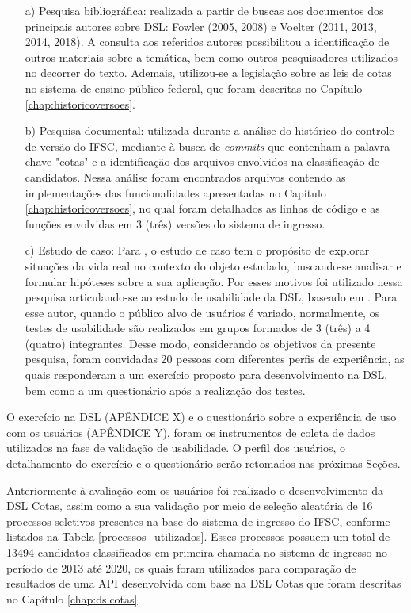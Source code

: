\begin{enumerate}
    \item[a)] Pesquisa bibliográfica: realizada a partir de buscas aos documentos dos principais autores sobre \gls{DSL}: Fowler (2005, 2008) e Voelter (2011, 2013, 2014, 2018). A consulta aos referidos autores possibilitou a identificação de outros materiais sobre a temática, bem como outros pesquisadores utilizados no decorrer do texto. Ademais, utilizou-se a legislação sobre as leis de cotas no sistema de ensino público federal, que foram descritas no Capítulo \ref{chap:historicoversoes}. 

    
    \item[b)] Pesquisa documental: utilizada durante a análise do histórico do controle de versão do \gls{IFSC}, mediante à busca de \textit{commits} que contenham a palavra-chave "cotas" e a identificação dos arquivos envolvidos na classificação de candidatos. Nessa análise foram encontrados arquivos contendo as implementações das funcionalidades apresentadas no Capítulo \ref{chap:historicoversoes}, no qual foram detalhados as linhas de código e as funções envolvidas em 3 (três) versões do sistema de ingresso. 
    
    \item[c)] Estudo de caso: Para , o estudo de caso tem o propósito de explorar situações da vida real no contexto do objeto estudado, buscando-se analisar e formular hipóteses sobre a sua aplicação. Por esses motivos foi utilizado nessa pesquisa articulando-se ao estudo de usabilidade da \gls{DSL}, baseado em . Para esse autor, quando o público alvo de usuários é variado, normalmente, os testes de usabilidade são realizados em grupos formados de 3 (três) a 4 (quatro) integrantes. Desse modo, considerando os objetivos da presente pesquisa, foram convidadas 20 pessoas com diferentes perfis de experiência, as quais responderam a um exercício proposto para desenvolvimento na \gls{DSL}, bem como a um questionário após a realização dos testes. 
    
\end{enumerate}

    O exercício na DSL (APÊNDICE X) e o questionário sobre a experiência de uso com os usuários (APÊNDICE Y), foram os instrumentos de coleta de dados utilizados na fase de validação de usabilidade. O perfil dos usuários, o detalhamento do exercício e o questionário serão retomados nas próximas Seções.
    
    Anteriormente à avaliação com os usuários foi realizado o desenvolvimento da DSL Cotas, assim como a sua validação por meio de seleção aleatória de 16 processos seletivos presentes na base do sistema de ingresso do \gls{IFSC}, conforme listados na Tabela \ref{processos_utilizados}. Esses processos possuem um total de 13494 candidatos classificados em primeira chamada no sistema de ingresso no período de 2013 até 2020, os quais foram utilizados para comparação de resultados de uma \gls{API} desenvolvida com base na DSL Cotas que foram descritas no Capítulo \ref{chap:dslcotas}.
    
